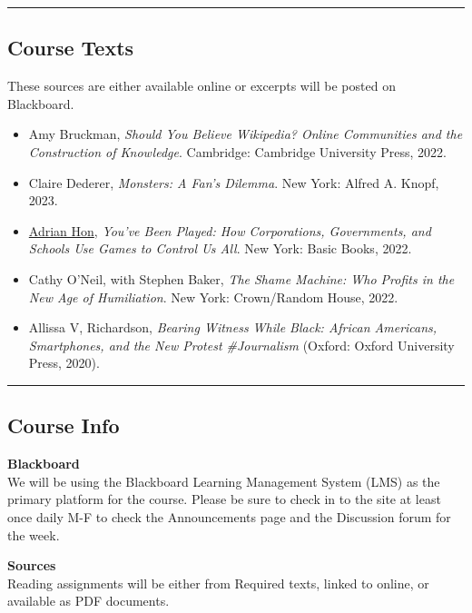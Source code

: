 \documentclass[
  letterpaper,
  DIV=11,
  numbers=noendperiod]{scrartcl}
\begin{document}
\begin{center}\rule{0.5\linewidth}{0.5pt}\end{center}

\hypertarget{course-texts}{%
\subsection{Course Texts}\label{course-texts}}

These sources are either available online or excerpts will be posted on
Blackboard.

\begin{itemize}
\item
  Amy Bruckman, \emph{Should You Believe Wikipedia? Online Communities
  and the Construction of Knowledge}. Cambridge: Cambridge University
  Press, 2022.
\item
  Claire Dederer, \emph{Monsters: A Fan's Dilemma}. New York: Alfred A.
  Knopf, 2023.
\item
  \href{https://mssv.net/}{Adrian Hon}, \emph{You've Been Played: How
  Corporations, Governments, and Schools Use Games to Control Us All}.
  New York: Basic Books, 2022.
\item
  Cathy O'Neil, with Stephen Baker, \emph{The Shame Machine: Who Profits
  in the New Age of Humiliation}. New York: Crown/Random House, 2022.
\item
  Allissa V, Richardson, \emph{Bearing Witness While Black: African
  Americans, Smartphones, and the New Protest \#Journalism} (Oxford:
  Oxford University Press, 2020).
\end{itemize}

\begin{center}\rule{0.5\linewidth}{0.5pt}\end{center}

\hypertarget{course-info}{%
\subsection{Course Info}\label{course-info}}

\textbf{Blackboard}\\
We will be using the Blackboard Learning Management System (LMS) as the
primary platform for the course. Please be sure to check in to the site
at least once daily M-F to check the Announcements page and the
Discussion forum for the week.

\textbf{Sources}\\
Reading assignments will be either from Required texts, linked to
online, or available as PDF documents.
\end{document}
